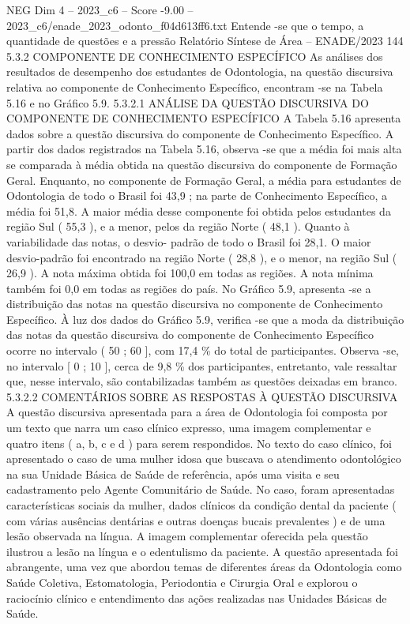 \begin{textsample}{NEG Dim 4 – 2023\_c6 – Score -9.00 – 2023\_c6/enade\_2023\_odonto\_f04d613ff6.txt}
Entende -se que o tempo, a quantidade de questões e a pressão Relatório Síntese de Área – ENADE/2023 144 5.3.2 COMPONENTE DE CONHECIMENTO ESPECÍFICO As análises dos resultados de desempenho dos estudantes de Odontologia, na questão discursiva relativa ao componente de Conhecimento Específico, encontram -se na Tabela 5.16 e no Gráfico 5.9. 5.3.2.1 ANÁLISE DA QUESTÃO DISCURSIVA DO COMPONENTE DE CONHECIMENTO ESPECÍFICO A Tabela 5.16 apresenta dados sobre a questão discursiva do componente de Conhecimento Específico.
A partir dos dados registrados na Tabela 5.16, observa -se que a média foi mais alta se comparada à média obtida na questão discursiva do componente de Formação Geral.
Enquanto, no componente de Formação Geral, a média para estudantes de Odontologia de todo o Brasil foi 43,9 ; na parte de Conhecimento Específico, a média foi 51,8.
A maior média desse componente foi obtida pelos estudantes da região Sul ( 55,3 ), e a menor, pelos da região Norte ( 48,1 ).
Quanto à variabilidade das notas, o desvio- padrão de todo o Brasil foi 28,1.
O maior desvio-padrão foi encontrado na região Norte ( 28,8 ), e o menor, na região Sul ( 26,9 ).
A nota máxima obtida foi 100,0 em todas as regiões.
A nota mínima também foi 0,0 em todas as regiões do país.
No Gráfico 5.9, apresenta -se a distribuição das notas na questão discursiva no componente de Conhecimento Específico.
À luz dos dados do Gráfico 5.9, verifica -se que a moda da distribuição das notas da questão discursiva do componente de Conhecimento Específico ocorre no intervalo ( 50 ; 60 ], com 17,4 \% do total de participantes.
Observa -se, no intervalo [ 0 ; 10 ], cerca de 9,8 \% dos participantes, entretanto, vale ressaltar que, nesse intervalo, são contabilizadas também as questões deixadas em branco. 5.3.2.2 COMENTÁRIOS SOBRE AS RESPOSTAS À QUESTÃO DISCURSIVA A questão discursiva apresentada para a área de Odontologia foi composta por um texto que narra um caso clínico expresso, uma imagem complementar e quatro itens ( a, b, c e d ) para serem respondidos.
No texto do caso clínico, foi apresentado o caso de uma mulher idosa que buscava o atendimento odontológico na sua Unidade Básica de Saúde de referência, após uma visita e seu cadastramento pelo Agente Comunitário de Saúde.
No caso, foram apresentadas características sociais da mulher, dados clínicos da condição dental da paciente ( com várias ausências dentárias e outras doenças bucais prevalentes ) e de uma lesão observada na língua.
A imagem complementar oferecida pela questão ilustrou a lesão na língua e o edentulismo da paciente.
A questão apresentada foi abrangente, uma vez que abordou temas de diferentes áreas da Odontologia como Saúde Coletiva, Estomatologia, Periodontia e Cirurgia Oral e explorou o raciocínio clínico e entendimento das ações realizadas nas Unidades Básicas de Saúde.

\end{textsample}
